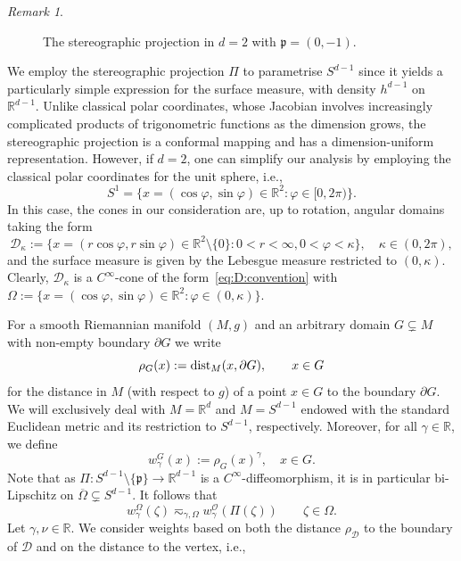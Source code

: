 \documentclass[12pt,a4paper, reqno]{amsart}
\theoremstyle{plain}
\theoremstyle{definition}
\theoremstyle{remark}
\newtheorem{remark}[theorem]{Remark}
\numberwithin{equation}{section}
\newcommand{\1}{\mathbbm{1}}
\newcommand{\R}{\ensuremath{\mathbb{R}}}
\newcommand{\calO}{\ensuremath{\mathcal{O}}}
\newcommand{\calD}{\ensuremath{\mathcal{D}}}
\newcommand{\todoE}[1]{\todo[color=yellow,inline]{#1}}
\newcommand{\todoT}[1]{\todo[color=green,inline]{Tobias: #1}}
\begin{document}
\begin{remark}
\begin{figure}
\begin{tikzpicture}[scale=2]
        \end{tikzpicture}   
\caption{The stereographic projection in $d=2$ with $\mathfrak{p}=(0,-1)$. }
    \label{fig:stereo:2D}
\end{figure}
We employ the stereographic projection $ \Pi$ to parametrise $S^{d-1}$
 since it yields a particularly simple expression for the surface measure, with density $h^{d-1}$ on $\R^{d-1}$. Unlike classical polar coordinates, whose Jacobian involves increasingly complicated products of trigonometric functions as the dimension grows, the stereographic projection is a conformal mapping  and has a  dimension-uniform representation. 
    However, if $d=2$, one can simplify our analysis by employing  the classical polar coordinates for the unit sphere, i.e.,
    \[
    S^{1}= \{ x=(\cos\varphi, \sin\varphi)\in \R^2\colon \varphi\in [0,2\pi)\}.
    \]
    In this case, the cones in our consideration are, up to rotation, angular domains taking the form 
    \[\calD_\kappa:= \{x=(r\cos\varphi, r\sin \varphi)\in \R^2\setminus\{0\}\colon 0<r<\infty, 0<\varphi<\kappa\}, \quad \kappa\in (0,2\pi),\]
    and the surface measure is given by the Lebesgue measure restricted to $(0,\kappa)$. Clearly, $\calD_\kappa$ is a $C^\infty$-cone of the form~\eqref{eq:D:convention} with $\Omega:=\{x=(\cos\varphi, \sin\varphi)\in \R^2\colon \varphi\in (0,\kappa)\}$. 
\end{remark}
For a smooth Riemannian manifold $(M,g)$ and an arbitrary domain $G\subsetneq M$ with non-empty boundary $\partial G$ we write $$\rho_G(x):= \textup{dist}_M(x,\partial G), \qquad x \in G$$ for the distance in $M$ (with respect to $g$) of a point $x\in G$ to the boundary $\partial G$. We will exclusively deal with $M=\R^d$ and $M=S^{d-1}$ endowed with the standard Euclidean metric and its restriction to $S^{d-1}$, respectively.
Moreover, for all $\gamma\in\R$, we define
\[
w_\gamma^G(x):=\rho_G(x)^\gamma,\quad x\in G.
\]
Note that as $\Pi\colon S^{d-1}\setminus\{\mathfrak p\}\to \R^{d-1}$ is a $C^\infty$-diffeomorphism, it is in particular bi-Lipschitz on $\overline{\Omega}\subsetneq S^{d-1}$. It follows that
\begin{equation}\label{eq:OmegavsscrO}
    w_\gamma^\Omega(\zeta)\eqsim_{\gamma,\Omega} w_\gamma^{\calO}(\Pi(\zeta))\qquad \zeta\in \Omega.
\end{equation}
Let $\gamma,\nu\in\R$. We consider weights based on both the distance $\rho_\calD$ to the boundary of $\calD$ and on the distance to the vertex, i.e.,
\end{document}

